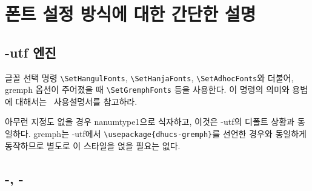 \documentclass[
	12pt,
	a4paper,
	kosection,
	footnote,
	nobookmarks,
	microtype,
]{oblivoir}
\def\myREF#1#2{\ref{#1}}
\def\myLabel#1#2{\label{#1}}
\def\myREF#1#2{\ref{#2}}
\def\myLabel#1#2{\label{#2}}
\newcommand\xobclass{x\-ob\-liv\-oir\oblivoirallowbreak}
\newcommand\obclass{ob\-liv\-oir\oblivoirallowbreak}
\begin{document}

\section{폰트 설정 방식에 대한 간단한 설명}\myLabel{sec:font}{sec:폰트}

\subsection{\koTeX-utf 엔진}

글꼴 선택 명령 \verb|\SetHangulFonts|, \verb|\SetHanjaFonts|, \verb|\SetAdhocFonts|와 더불어,
gremph 옵션이 주어졌을 때 \verb|\SetGremphFonts| 등을 사용한다.
이 명령의 의미와 용법에 대해서는 \koTeX\ 사용설명서를 참고하라.

아무런 지정도 없을 경우 nanumtype1으로 식자하고, 이것은 \koTeX-utf의 디폴트 상황과 동일하다.
gremph는 \koTeX-utf에서 \verb|\usepackage{dhucs-gremph}|를 선언한 경우와 동일하게
동작하므로 별도로 이 스타일을 얹을 필요는 없다.

\subsection{\XeTeX-\ko, \LuaTeX-\ko}
\end{document}
